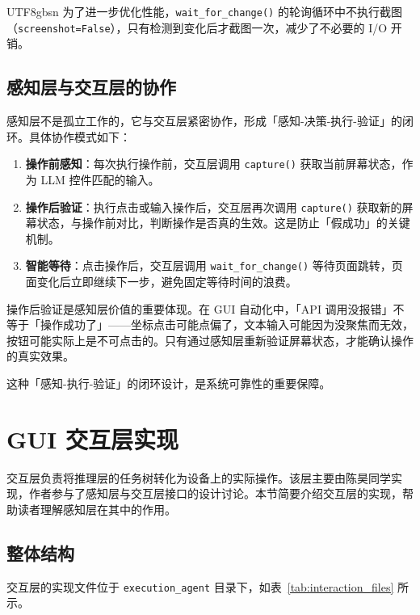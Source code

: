 \documentclass{article}
\begin{document}
\begin{CJK}{UTF8}{gbsn}
为了进一步优化性能，\texttt{wait\_for\_change()} 的轮询循环中不执行截图（\texttt{screenshot=False}），只有检测到变化后才截图一次，减少了不必要的 I/O 开销。

\subsection{感知层与交互层的协作}

感知层不是孤立工作的，它与交互层紧密协作，形成「感知-决策-执行-验证」的闭环。具体协作模式如下：

\begin{enumerate}[leftmargin=1.5em]
  \item \textbf{操作前感知}：每次执行操作前，交互层调用 \texttt{capture()} 获取当前屏幕状态，作为 LLM 控件匹配的输入。
  \item \textbf{操作后验证}：执行点击或输入操作后，交互层再次调用 \texttt{capture()} 获取新的屏幕状态，与操作前对比，判断操作是否真的生效。这是防止「假成功」的关键机制。
  \item \textbf{智能等待}：点击操作后，交互层调用 \texttt{wait\_for\_change()} 等待页面跳转，页面变化后立即继续下一步，避免固定等待时间的浪费。
\end{enumerate}

操作后验证是感知层价值的重要体现。在 GUI 自动化中，「API 调用没报错」不等于「操作成功了」——坐标点击可能点偏了，文本输入可能因为没聚焦而无效，按钮可能实际上是不可点击的。只有通过感知层重新验证屏幕状态，才能确认操作的真实效果。

这种「感知-执行-验证」的闭环设计，是系统可靠性的重要保障。

\section{GUI 交互层实现}
\label{sec:interaction_layer}

交互层负责将推理层的任务树转化为设备上的实际操作。该层主要由陈昊同学实现，作者参与了感知层与交互层接口的设计讨论。本节简要介绍交互层的实现，帮助读者理解感知层在其中的作用。

\subsection{整体结构}

交互层的实现文件位于 \texttt{execution\_agent} 目录下，如表~\ref{tab:interaction_files} 所示。


\end{CJK}
\end{document}
